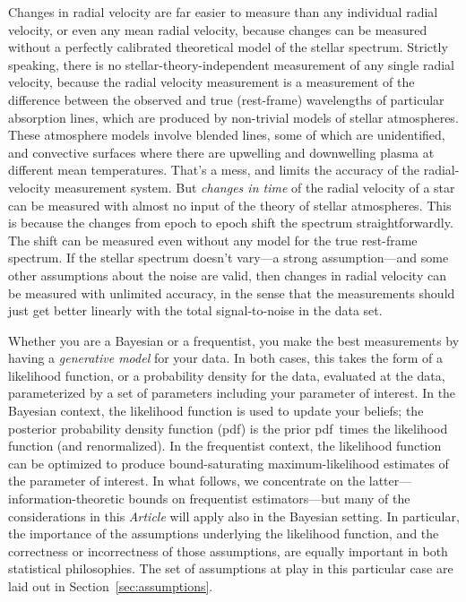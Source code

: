 \documentclass[modern]{aastex631}
\newcommand{\documentname}{\textsl{Article}}
\newcommand{\sectionname}{Section}
\newcommand{\secref}[1]{\sectionname~\ref{#1}}
\newcommand{\pdf}{pdf} %
\begin{document}
Changes in radial velocity are far easier to measure than any individual radial velocity, or even any mean radial velocity, because changes can be measured without a perfectly calibrated theoretical model of the stellar spectrum.
Strictly speaking, there is no stellar-theory-independent measurement of any single radial velocity, because the radial velocity measurement is a measurement of the difference between the observed and true (rest-frame) wavelengths of particular absorption lines, which are produced by non-trivial models of stellar atmospheres.
These atmosphere models involve blended lines, some of which are unidentified, and convective surfaces where there are upwelling and downwelling plasma at different mean temperatures.
That's a mess, and limits the accuracy of the radial-velocity measurement system.
But \emph{changes in time} of the radial velocity of a star can be measured with almost no input of the theory of stellar atmospheres.
This is because the changes from epoch to epoch shift the spectrum straightforwardly.
The shift can be measured even without any model for the true rest-frame spectrum.
If the stellar spectrum doesn't vary---a strong assumption---and some other assumptions about the noise are valid, then changes in radial velocity can be measured with unlimited accuracy, in the sense that the measurements should just get better linearly with the total signal-to-noise in the data set.

Whether you are a Bayesian or a frequentist, you make the best measurements by having a \emph{generative model} for your data.
In both cases, this takes the form of a likelihood function, or a probability density for the data, evaluated at the data, parameterized by a set of parameters including your parameter of interest.
In the Bayesian context, the likelihood function is used to update your beliefs; the posterior probability density function (\pdf) is the prior \pdf\ times the likelihood function (and renormalized).
In the frequentist context, the likelihood function can be optimized to produce bound-saturating maximum-likelihood estimates of the parameter of interest.
In what follows, we concentrate on the latter---information-theoretic bounds on frequentist estimators---but many of the considerations in this \documentname{} will apply also in the Bayesian setting.
In particular, the importance of the assumptions underlying the likelihood function, and the correctness or incorrectness of those assumptions, are equally important in both statistical philosophies.
The set of assumptions at play in this particular case are laid out in \secref{sec:assumptions}.
\end{document}
